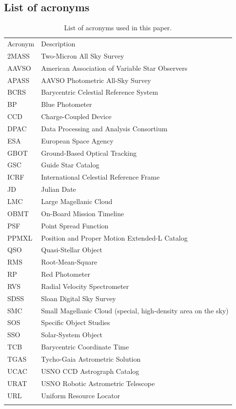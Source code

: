 \documentclass[longauth]{aa_gaia} %
\begin{document}
\begin{appendix}

  \section{List of acronyms}

  \begin{table}[h]
    \caption{List of acronyms used in this paper.\label{app:acronyms}}
    \begin{tabular}{ll}
      \hline\hline
      \noalign{\smallskip}
      Acronym & Description \\
      \noalign{\smallskip}
      \hline
      \noalign{\smallskip}
      2MASS&Two-Micron All Sky Survey \\
      AAVSO&American Association of Variable Star Observers \\
      APASS&AAVSO Photometric All-Sky Survey \\
      BCRS&Barycentric Celestial Reference System \\
      BP&Blue Photometer \\
      CCD&Charge-Coupled Device \\
      DPAC&Data Processing and Analysis Consortium \\
      ESA&European Space Agency \\
      GBOT&Ground-Based Optical Tracking \\
      GSC&Guide Star Catalog \\
      ICRF&International Celestial Reference Frame \\
      JD&Julian Date \\
      LMC&Large Magellanic Cloud \\
      OBMT&On-Board Mission Timeline \\
      PSF&Point Spread Function \\
      PPMXL&Position and Proper Motion Extended-L Catalog \\
      QSO&Quasi-Stellar Object \\
      RMS&Root-Mean-Square \\
      RP&Red Photometer \\
      RVS&Radial Velocity Spectrometer \\
      SDSS&Sloan Digital Sky Survey \\
      SMC&Small Magellanic Cloud (special, high-density area on the sky) \\
      SOS&Specific Object Studies \\
      SSO&Solar-System Object \\
      TCB&Barycentric Coordinate Time \\
      TGAS&Tycho-Gaia Astrometric Solution \\
      UCAC&USNO CCD Astrograph Catalog \\
      URAT&USNO Robotic Astrometric Telescope \\
      URL&Uniform Resource Locator \\
      \noalign{\smallskip}
      \hline
    \end{tabular}
  \end{table}

\end{appendix}
\end{document}
